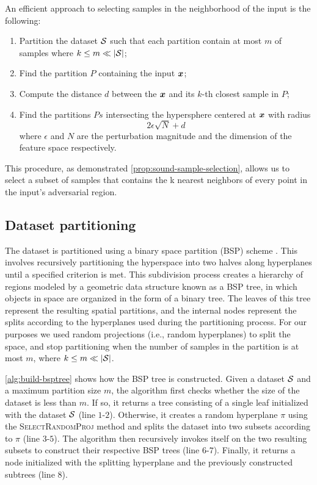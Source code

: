 \noindent An efficient approach to selecting samples in the neighborhood of the input is the following:
\begin{enumerate}
  \item Partition the dataset $\mathcal{S}$ such that each partition contain at most $m$ of samples where $k \le m \ll |\mathcal{S}|$;
  \item Find the partition $P$ containing the input $\bm{x}$;
  \item Compute the distance $d$ between the $\bm{x}$ and its $k$-th closest sample in $P$;
  \item Find the partitions $Ps$ intersecting the hypersphere centered at  $\bm{x}$ with radius
  \[
    2\epsilon\sqrt{N} + d
  \]
  where $\epsilon$ and $N$ are the perturbation magnitude and the dimension of the feature space respectively.
\end{enumerate}
\noindent This procedure, as demonstrated \autoref{prop:sound-sample-selection}, allows us to select a subset of samples that contains the k nearest neighbors of every point in the input's adversarial region.

\subsection{Dataset partitioning}
The dataset is partitioned using a binary space partition (BSP) scheme \cite{bsp-tree}. This involves recursively partitioning the hyperspace into two halves along hyperplanes until a specified criterion is met. This subdivision process creates a hierarchy of regions modeled by a geometric data structure known as a BSP tree, in which objects in space are organized in the form of a binary tree. The leaves of this tree represent the resulting spatial partitions, and the internal nodes represent the splits according to the hyperplanes used during the partitioning process. For our purposes we used random projections \cite{random-projection} (i.e., random hyperplanes) to split the space, and stop partitioning when the number of samples in the partition is at most $m$, where $k \le m \ll |\mathcal{S}|$.

\autoref{alg:build-bsptree} shows how the BSP tree is constructed. Given a dataset $\mathcal{S}$ and a maximum partition size $m$, the algorithm first checks whether the size of the dataset is less than $m$. If so, it returns a tree consisting of a single leaf initialized with the dataset $\mathcal{S}$ (line $1$-$2$). Otherwise, it creates a random hyperplane $\pi$ using the \textsc{SelectRandomProj} method and splits the dataset into two subsets according to  $\pi$  (line $3$-$5$). The algorithm then recursively invokes itself on the two resulting subsets to construct their respective BSP trees (line $6$-$7$). Finally, it returns a node initialized with the splitting hyperplane and the previously constructed subtrees (line $8$).


